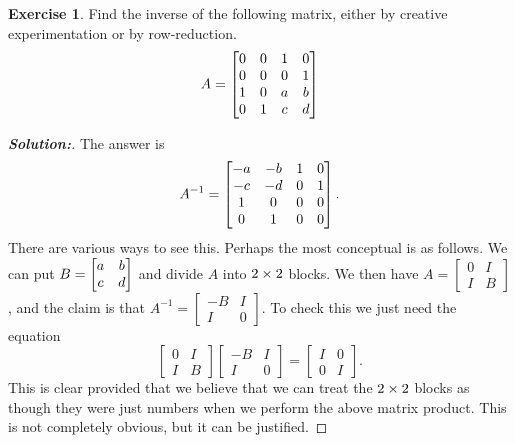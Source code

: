 \documentclass[a4paper]{amsart}
\theoremstyle{definition}
\newtheorem{exercise}{Exercise}
\newenvironment{solution}{\begin{proof}[\textbf{Solution:}] \vphantom{u}}{\end{proof}}
\begin{document}
\begin{exercise}\label{ex-inverse-ii}
 Find the inverse of the following matrix, either by creative
 experimentation or by row-reduction.
 \[ A = \left[\begin{matrix} 0&0&1&0 \\ 0&0&0&1 \\ 1&0&a&b \\ 0&1&c&d \end{matrix}\right] \]
\end{exercise}
\begin{solution}
 The answer is
 \[ A^{-1} =
     \left[\begin{matrix} -a&-b&1&0 \\ -c&-d&0&1 \\ 1&0&0&0 \\ 0&1&0&0 \end{matrix}\right].
 \]
 There are various ways to see this.  Perhaps the most conceptual is
 as follows.  We can put $B=\left[\begin{matrix} a&b\\ c&d\end{matrix}\right]$ and divide $A$ into
 $2\times 2$ blocks.  We then have
 $A=\left[\begin{array}{c|c} 0&I\\ \hline I&B\end{array}\right]$, and
 the claim is that 
 $A^{-1}=\left[\begin{array}{c|c} -B&I\\ \hline I&0\end{array}\right]$.
 To check this we just need the equation
 \[ \left[\begin{array}{c|c}  0&I \\ \hline I&B\end{array}\right]
    \left[\begin{array}{c|c} -B&I \\ \hline I&0\end{array}\right] = 
    \left[\begin{array}{c|c}  I&0 \\ \hline 0&I\end{array}\right].
 \]
 This is clear provided that we believe that we can treat the $2\times 2$
 blocks as though they were just numbers when we perform the above
 matrix product.  This is not completely obvious, but it can be
 justified. 


\end{solution}
\end{document}
